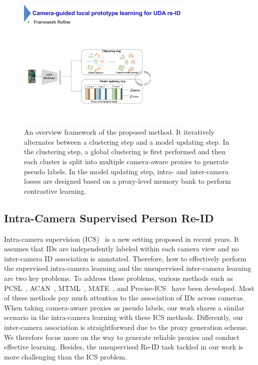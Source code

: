 \documentclass[letterpaper]{article} %
\begin{document}
\begin{figure}[t]
\centering
\centering
\includegraphics[width=0.76\textwidth]{./framework_v} 
\caption{An overview framework of the proposed method. It iteratively alternates between a clustering step and a model updating step. In the clustering step, a global clustering is first performed and then each cluster is split into multiple camera-aware proxies to generate pseudo labels. In the model updating step, intra- and inter-camera losses are designed based on a proxy-level memory bank to perform contrastive learning.}
\label{fig_framework}
\end{figure}


\subsection{Intra-Camera Supervised Person Re-ID}
Intra-camera supervision (ICS)~\cite{zhu2019intra, qi2019progressive} is a new setting proposed in recent years. It assumes that IDs are independently labeled within each camera view and no inter-camera ID association is annotated. Therefore, how to effectively perform the supervised intra-camera learning and the unsupervised inter-camera learning are two key problems. To address these problems, various methods such as PCSL~\cite{qi2019progressive}, ACAN~\cite{qi2019intra}, MTML~\cite{zhu2019intra}, MATE~\cite{zhu2020intra}, and Precise-ICS~\cite{wang2021} have been developed. Most of these methods pay much attention to the association of IDs across cameras. When taking camera-aware proxies as pseudo labels, our work shares a similar scenario in the intra-camera learning with these ICS methods. Differently, our inter-camera association is straightforward due to the proxy generation scheme. We therefore focus more on the way to generate reliable proxies and conduct effective learning. Besides, the unsupervised Re-ID task tackled in our work is more challenging than the ICS problem.
\end{document}
